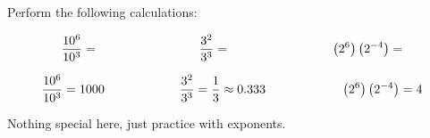

Perform the following calculations:

$${10^{6} \over 10^{3}} = \hbox{\hskip 80pt} {3^{2} \over 3^{3}} = \hbox{\hskip 80pt} \left( 2^6 \right) \left( 2^{-4} \right) = $$







$${10^{6} \over 10^{3}} = 1000 \hbox{\hskip 60pt} {3^{2} \over 3^{3}} = {1 \over 3} \approx 0.333 \hbox{\hskip 60pt} \left( 2^6 \right) \left( 2^{-4} \right) = 4$$







Nothing special here, just practice with exponents.




